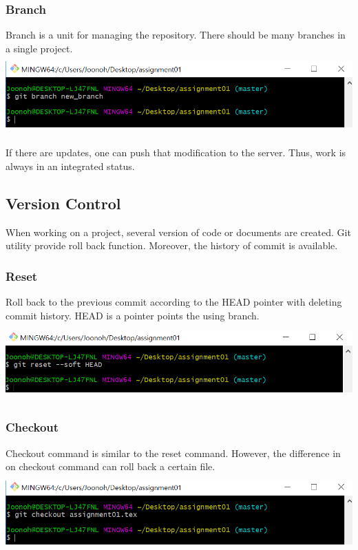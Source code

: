 \documentclass[18pt]{article}%
\begin{document}
\subsubsection {Branch}
Branch is a unit for managing the repository. There should be many branches in a single project.\\
\includegraphics[height=3cm]{branch.PNG}

If there are updates, one can push that modification to the server. Thus, work is always in an integrated status.

 
 \subsection {Version Control}
When working on a project, several version of code or documents are created. Git utility provide roll back function. Moreover, the history of commit is available.

\subsubsection {Reset}
Roll back to the previous commit according to the HEAD pointer with deleting commit history. HEAD is a pointer points the using branch.\\
\includegraphics[height=3cm]{reset.PNG}

\subsubsection {Checkout}
Checkout command is similar to the reset command. However, the difference in on checkout command can roll back a certain file.\\
\includegraphics[height=3cm]{checkout.PNG}
\end{document}
